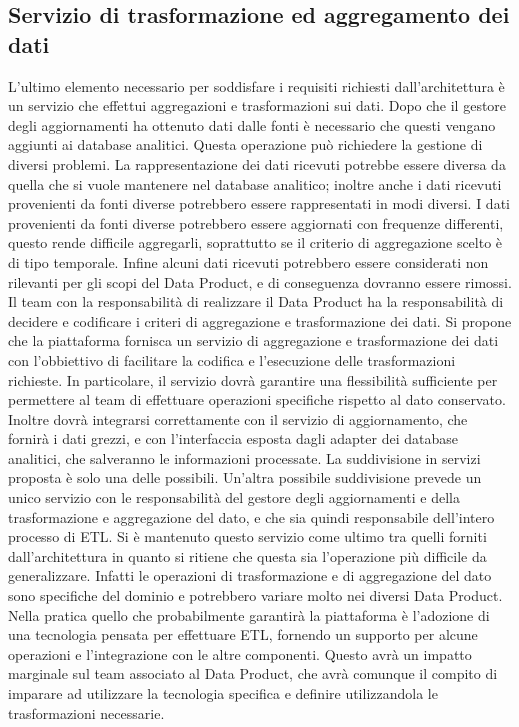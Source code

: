 \documentclass[12pt]{report}
\begin{document}
\subsection{Servizio di trasformazione ed aggregamento dei dati}
L'ultimo elemento necessario per soddisfare i requisiti richiesti dall'architettura è un servizio che effettui aggregazioni e trasformazioni sui dati.
Dopo che il gestore degli aggiornamenti ha ottenuto dati dalle fonti è necessario che questi vengano aggiunti ai database analitici.
Questa operazione può richiedere la gestione di diversi problemi.
La rappresentazione dei dati ricevuti potrebbe essere diversa da quella che si vuole mantenere nel database analitico; inoltre anche i dati ricevuti provenienti da fonti diverse potrebbero essere rappresentati in modi diversi.
I dati provenienti da fonti diverse potrebbero essere aggiornati con frequenze differenti, questo rende difficile aggregarli, soprattutto se il criterio di aggregazione scelto  è di tipo temporale.
Infine alcuni dati ricevuti potrebbero essere considerati non rilevanti per gli scopi del Data Product, e di conseguenza dovranno essere rimossi.
Il team con la responsabilità di realizzare il Data Product ha la responsabilità di decidere e codificare i criteri di aggregazione e trasformazione dei dati.
Si propone che la piattaforma fornisca un servizio di aggregazione e trasformazione dei dati con l'obbiettivo di facilitare la codifica e l'esecuzione delle trasformazioni richieste.
In particolare, il servizio dovrà garantire una flessibilità sufficiente per permettere al team di effettuare operazioni specifiche rispetto al dato conservato.
Inoltre dovrà integrarsi correttamente con il servizio di aggiornamento, che fornirà i dati grezzi, e con l'interfaccia esposta dagli adapter dei database analitici, che salveranno le informazioni processate.
La suddivisione in servizi proposta è solo una delle possibili. 
Un'altra possibile suddivisione prevede un unico servizio con le responsabilità del gestore degli aggiornamenti e della  trasformazione e aggregazione del dato, e che sia quindi responsabile dell'intero processo di ETL.
Si è mantenuto questo servizio come ultimo tra quelli forniti dall'architettura in quanto si ritiene che questa sia l'operazione più difficile da generalizzare.
Infatti le operazioni di trasformazione e di aggregazione del dato sono specifiche del dominio e potrebbero variare molto nei diversi Data Product.
Nella pratica quello che probabilmente garantirà la piattaforma è l'adozione di una tecnologia pensata per effettuare ETL, fornendo un supporto per alcune operazioni e l'integrazione con le altre componenti.
Questo avrà un impatto marginale sul team associato al Data Product, che avrà comunque il compito di imparare ad utilizzare la tecnologia specifica e definire utilizzandola le trasformazioni necessarie.
\end{document}
